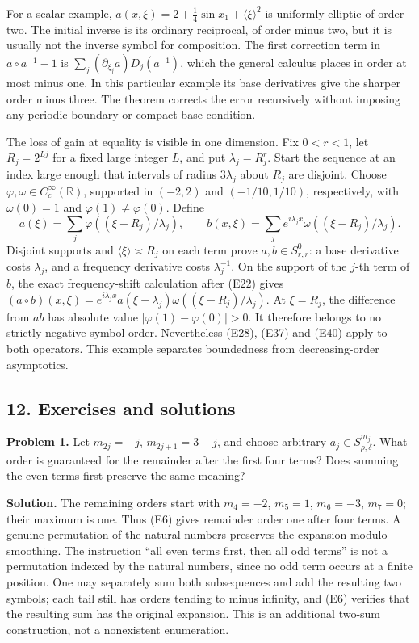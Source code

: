\documentclass[
  11pt,
]{article}
\begin{document}
For a scalar example,
\(a(x,\xi)=2+\tfrac14\sin x_1+\langle\xi\rangle^2\) is uniformly
elliptic of order two. The initial inverse is its ordinary reciprocal,
of order minus two, but it is usually not the inverse symbol for
composition. The first correction term in \(a\circ a^{-1}-1\) is
\(\sum_j(\partial_{\xi_j}a)D_j(a^{-1})\), which the general calculus
places in order at most minus one. In this particular example its base
derivatives give the sharper order minus three. The theorem corrects the
error recursively without imposing any periodic-boundary or compact-base
condition.

The loss of gain at equality is visible in one dimension. Fix \(0<r<1\),
let \(R_j=2^{Lj}\) for a fixed large integer \(L\), and put
\(\lambda_j=R_j^r\). Start the sequence at an index large enough that
intervals of radius \(3\lambda_j\) about \(R_j\) are disjoint. Choose
\(\varphi,\omega\in C_c^\infty(\mathbb R)\), supported in \((-2,2)\) and
\((-1/10,1/10)\), respectively, with \(\omega(0)=1\) and
\(\varphi(1)\ne\varphi(0)\). Define \[
a(\xi)=\sum_j\varphi((\xi-R_j)/\lambda_j),
\qquad
b(x,\xi)=\sum_j e^{i\lambda_j x}
\omega((\xi-R_j)/\lambda_j).
\tag{E47}
\] Disjoint supports and \(\langle\xi\rangle\asymp R_j\) on each term
prove \(a,b\in S^0_{r,r}\): a base derivative costs \(\lambda_j\), and a
frequency derivative costs \(\lambda_j^{-1}\). On the support of the
\(j\)-th term of \(b\), the exact frequency-shift calculation after
(E22) gives
\((a\circ b)(x,\xi)=e^{i\lambda_jx}a(\xi+\lambda_j)\omega((\xi-R_j)/\lambda_j)\).
At \(\xi=R_j\), the difference from \(ab\) has absolute value
\(|\varphi(1)-\varphi(0)|>0\). It therefore belongs to no strictly
negative symbol order. Nevertheless (E28), (E37) and (E40) apply to both
operators. This example separates boundedness from decreasing-order
asymptotics.

\subsection{12. Exercises and solutions}\label{exercises-and-solutions}

\textbf{Problem 1.} Let \(m_{2j}=-j\), \(m_{2j+1}=3-j\), and choose
arbitrary \(a_j\in S^{m_j}_{\rho,\delta}\). What order is guaranteed for
the remainder after the first four terms? Does summing the even terms
first preserve the same meaning?

\textbf{Solution.} The remaining orders start with \(m_4=-2\),
\(m_5=1\), \(m_6=-3\), \(m_7=0\); their maximum is one. Thus (E6) gives
remainder order one after four terms. A genuine permutation of the
natural numbers preserves the expansion modulo smoothing. The
instruction ``all even terms first, then all odd terms'' is not a
permutation indexed by the natural numbers, since no odd term occurs at
a finite position. One may separately sum both subsequences and add the
resulting two symbols; each tail still has orders tending to minus
infinity, and (E6) verifies that the resulting sum has the original
expansion. This is an additional two-sum construction, not a nonexistent
enumeration.
\end{document}
